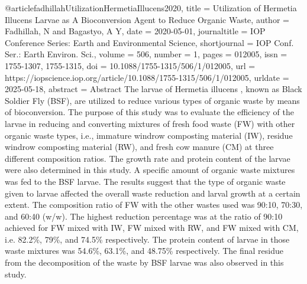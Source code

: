 {{{@article{fadhillahUtilizationHermetiaIllucens2020,
  title = {Utilization of {{Hermetia}} Illucens {{Larvae}} as {{A Bioconversion Agent}} to {{Reduce Organic Waste}}},
  author = {Fadhillah, N and Bagastyo, A Y},
  date = {2020-05-01},
  journaltitle = {IOP Conference Series: Earth and Environmental Science},
  shortjournal = {IOP Conf. Ser.: Earth Environ. Sci.},
  volume = {506},
  number = {1},
  pages = {012005},
  issn = {1755-1307, 1755-1315},
  doi = {10.1088/1755-1315/506/1/012005},
  url = {https://iopscience.iop.org/article/10.1088/1755-1315/506/1/012005},
  urldate = {2025-05-18},
  abstract = {Abstract                            The larvae of               Hermetia illucens               , known as Black Soldier Fly (BSF), are utilized to reduce various types of organic waste by means of bioconversion. The purpose of this study was to evaluate the efficiency of the larvae in reducing and converting mixtures of fresh food waste (FW) with other organic waste types, i.e., immature windrow composting material (IW), residue windrow composting material (RW), and fresh cow manure (CM) at three different composition ratios. The growth rate and protein content of the larvae were also determined in this study. A specific amount of organic waste mixtures was fed to the BSF larvae. The results suggest that the type of organic waste given to larvae affected the overall waste reduction and larval growth at a certain extent. The composition ratio of FW with the other wastes used was 90:10, 70:30, and 60:40 (w/w). The highest reduction percentage was at the ratio of 90:10 achieved for FW mixed with IW, FW mixed with RW, and FW mixed with CM, i.e. 82.2\%, 79\%, and 74.5\% respectively. The protein content of larvae in those waste mixtures was 54.6\%, 63.1\%, and 48.75\% respectively. The final residue from the decomposition of the waste by BSF larvae was also observed in this study.}
}

}}}
